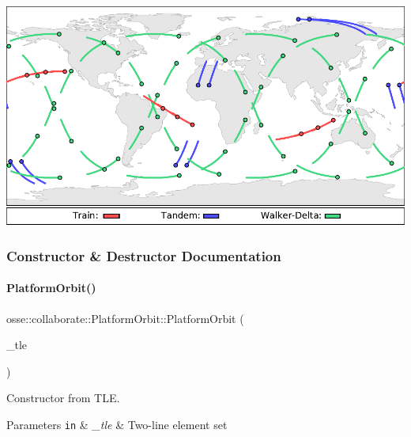  
\begin{DoxyImageNoCaption}
  \mbox{\includegraphics[width=\textwidth]{constellations}}
\end{DoxyImageNoCaption}
 

\subsubsection{Constructor \& Destructor Documentation}
\mbox{\label{classosse_1_1collaborate_1_1_platform_orbit_a7883ef54a0b5d13497fd6d21c3bd2ebf}} 
\paragraph{\texorpdfstring{Platform\+Orbit()}{PlatformOrbit()}}
{\footnotesize\ttfamily osse\+::collaborate\+::\+Platform\+Orbit\+::\+Platform\+Orbit (\begin{DoxyParamCaption}\item[{const \hyperlink{classosse_1_1collaborate_1_1_platform_orbit_aeb5892b2982d26547cead0beebc81fe0}{Two\+Line\+Element\+Set} \&}]{\+\_\+tle }\end{DoxyParamCaption})\hspace{0.3cm}{\ttfamily [explicit]}}



Constructor from T\+LE. 


\begin{DoxyParams}[1]{Parameters}
\mbox{\tt in}  & {\em \+\_\+tle} & Two-\/line element set \\
\hline
\end{DoxyParams}


